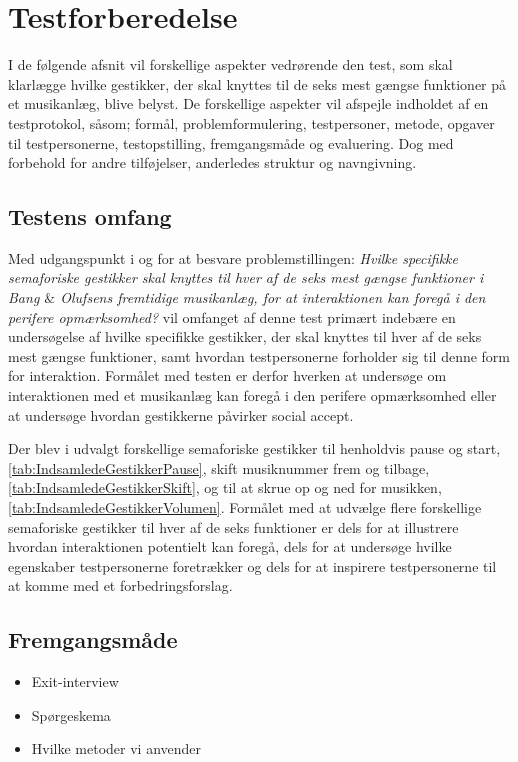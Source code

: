\section{Testforberedelse}
\label{Testforberedelse}
%
I de følgende afsnit vil forskellige aspekter vedrørende den test, som skal klarlægge hvilke gestikker, der skal knyttes til de seks mest gængse funktioner på et musikanlæg, blive belyst. De forskellige aspekter vil afspejle indholdet af en testprotokol, såsom; formål, problemformulering, testpersoner, metode, opgaver til testpersonerne, testopstilling, fremgangsmåde og evaluering. Dog med forbehold for andre tilføjelser, anderledes struktur og navngivning. 
%

\subsection{Testens omfang}
\label{TestensOmfangValgAfGestikker}
%
Med udgangspunkt i og for at besvare problemstillingen: \textit{Hvilke specifikke semaforiske gestikker skal knyttes til hver af de seks mest gængse funktioner i Bang $\&$ Olufsens fremtidige musikanlæg, for at interaktionen kan foregå i den perifere opmærksomhed?} vil omfanget af denne test primært indebære en undersøgelse af hvilke specifikke gestikker, der skal knyttes til hver af de seks mest gængse funktioner, samt hvordan testpersonerne forholder sig til denne form for interaktion. Formålet med testen er derfor hverken at undersøge om interaktionen med et musikanlæg kan foregå i den perifere opmærksomhed eller at undersøge hvordan gestikkerne påvirker social accept. 

Der blev i  udvalgt forskellige semaforiske gestikker til henholdvis pause og start, \autoref{tab:IndsamledeGestikkerPause}, skift musiknummer frem og tilbage, \autoref{tab:IndsamledeGestikkerSkift}, og til at skrue op og ned for musikken, \autoref{tab:IndsamledeGestikkerVolumen}. Formålet med at udvælge flere forskellige semaforiske gestikker til hver af de seks funktioner er dels for at illustrere hvordan interaktionen potentielt kan foregå, dels for at undersøge hvilke egenskaber testpersonerne foretrækker og dels for at inspirere testpersonerne til at komme med et forbedringsforslag. 



%
\subsection{Fremgangsmåde}
\label{FremgangsmaadeValgAfGestikker}
%
\begin{itemize}
  \item Exit-interview
  \item Spørgeskema
  \item Hvilke metoder vi anvender 
\end{itemize}

